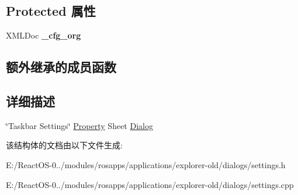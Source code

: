 \subsection*{Protected 属性}
\begin{DoxyCompactItemize}
\item 
\mbox{\label{struct_taskbar_settings_dlg_a98787d10b1acc7ca1a928129e1169d33}} 
X\+M\+L\+Doc {\bfseries \+\_\+cfg\+\_\+org}
\end{DoxyCompactItemize}
\subsection*{额外继承的成员函数}


\subsection{详细描述}
\char`\"{}\+Taskbar Settings\char`\"{} \hyperlink{struct_property}{Property} Sheet \hyperlink{struct_dialog}{Dialog} 

该结构体的文档由以下文件生成\+:\begin{DoxyCompactItemize}
\item 
E\+:/\+React\+O\+S-\/0../modules/rosapps/applications/explorer-\/old/dialogs/settings.\+h\item 
E\+:/\+React\+O\+S-\/0../modules/rosapps/applications/explorer-\/old/dialogs/settings.\+cpp\end{DoxyCompactItemize}
